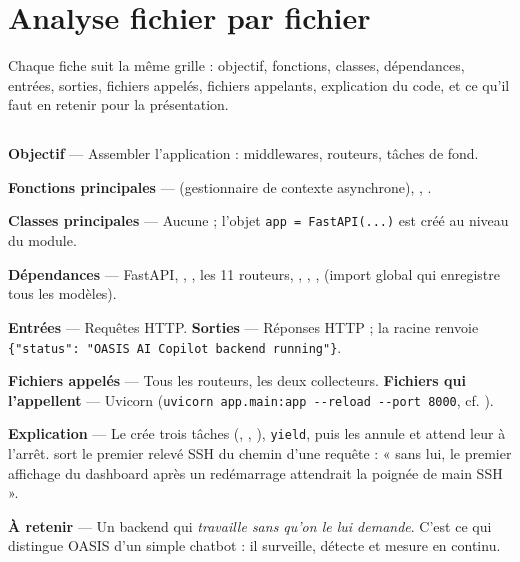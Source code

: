 \chapter{Analyse fichier par fichier}
\label{ch:fichiers}

Chaque fiche suit la même grille : objectif, fonctions, classes, dépendances,
entrées, sorties, fichiers appelés, fichiers appelants, explication du code, et
ce qu'il faut en retenir pour la présentation.

\section{}

\textbf{Objectif} --- Assembler l'application : middlewares, routeurs, tâches de
fond.

\textbf{Fonctions principales} ---  (gestionnaire de contexte
asynchrone), , .

\textbf{Classes principales} --- Aucune ; l'objet \texttt{app = FastAPI(...)} est
créé au niveau du module.

\textbf{Dépendances} --- FastAPI, , ,
les 11 routeurs, ,
, ,
 (import global qui enregistre tous les modèles).

\textbf{Entrées} --- Requêtes HTTP. \textbf{Sorties} --- Réponses HTTP ; la
racine  renvoie \texttt{\{"status": "OASIS AI Copilot backend
running"\}}.

\textbf{Fichiers appelés} --- Tous les routeurs, les deux collecteurs.
\textbf{Fichiers qui l'appellent} --- Uvicorn
(\texttt{uvicorn app.main:app -{}-reload -{}-port 8000}, cf.
).

\textbf{Explication} --- Le  crée trois tâches
(, ,
), \texttt{yield}, puis les annule et attend leur
 à l'arrêt.  sort le premier
relevé SSH du chemin d'une requête : « sans lui, le premier affichage du
dashboard après un redémarrage attendrait la poignée de main SSH ».

\textbf{À retenir} --- Un backend qui \emph{travaille sans qu'on le lui
demande}. C'est ce qui distingue OASIS d'un simple chatbot : il surveille,
détecte et mesure en continu.

